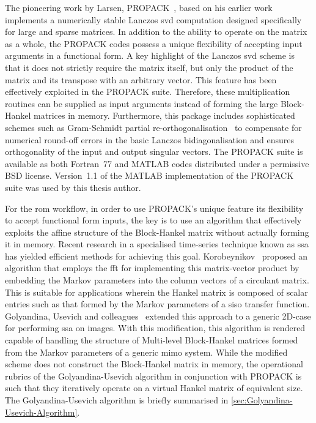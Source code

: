 The  pioneering  work  by  Larsen, PROPACK~\cite{LarsenPropack},  based  on  his
earlier work~\cite{Larsen1998} implements a numerically stable Lanczos \gls{svd}
computation designed specifically for large  and sparse matrices. In addition to
the ability  to operate on the  matrix as a  whole, the PROPACK codes  possess a
unique flexibility  of accepting  input arguments  in a  functional form.  A key
highlight of the  Lanczos \gls{svd} scheme is that it  does not strictly require
the  matrix  itself, but  only  the  product of  the  matrix  and its  transpose
with  an  arbitrary vector.  This  feature  has  been effectively  exploited  in
the  PROPACK suite.  Therefore, these  multiplication routines  can be  supplied
as  input  arguments instead  of  forming  the  large Block-Hankel  matrices  in
memory.  Furthermore,  this  package  includes  sophisticated  schemes  such  as
Gram-Schmidt  partial re-orthogonalisation~\cite{Bjorck1994}  to compensate  for
numerical round-off  errors in the  basic Lanczos bidiagonalisation  and ensures
orthogonality of  the input and  output singular  vectors. The PROPACK  suite is
available as both Fortran~77 and MATLAB codes distributed under a permissive BSD
license. Version~1.1 of the MATLAB implementation  of the PROPACK suite was used
by this thesis author.

For the \gls{rom} workflow, in order  to use PROPACK's unique feature \viz{} its
flexibility to  accept functional form  inputs, the key  is to use  an algorithm
that  effectively  exploits the  affine  structure  of the  Block-Hankel  matrix
without  actually  forming  it  in  memory. Recent  research  in  a  specialised
time-series technique known as \gls{ssa}~\cite{Elsner1996} has yielded efficient
methods for  achieving this goal.  Korobeynikov~\cite{Korobeynikov2010} proposed
an  algorithm that  employs the  \gls{fft} for  implementing this  matrix-vector
product  by  embedding the  Markov  parameters  into  the  column vectors  of  a
circulant  matrix.  This  is  suitable   for  applications  wherein  the  Hankel
matrix  is  composed  of scalar  entries  such  as  that  formed by  the  Markov
parameters  of   a  \gls{siso}   transfer  function.  Golyandina,   Usevich  and
colleagues~\cite{Golyandina2010,Golyandina2015}  extended  this  approach  to  a
generic  2D-case for  performing \gls{ssa}  on images.  With this  modification,
this  algorithm is  rendered capable  of handling  the structure  of Multi-level
Block-Hankel matrices formed from the  Markov parameters of a generic \gls{mimo}
system. While  the modified  scheme does not  construct the  Block-Hankel matrix
in  memory,  the operational  rubrics  of  the Golyandina-Usevich  algorithm  in
conjunction with  PROPACK is  such that  they iteratively  operate on  a virtual
Hankel matrix  of equivalent size.  The Golyandina-Usevich algorithm  is briefly
summarised in \cref{sec:Golyandina-Usevich-Algorithm}.

